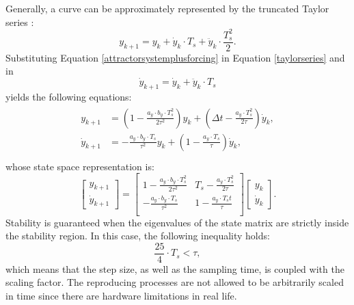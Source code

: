 Generally, a curve can be approximately represented by the truncated Taylor series \cite{gear1978stability}:
\begin{equation}
	\label{taylorseries}
	y_{k+1} = y_{k}+\dot{y}_{k}\cdot T_s + \ddot{y}_{k}\cdot\frac{T_{s}^2}{2}.
\end{equation}
Substituting Equation {\ref{attractorsystemplusforcing}} in Equation {\ref{taylorseries}} and in
\begin{equation}
	\dot{y}_{k+1}=\dot{y}_{k}+\ddot{y}_{k}\cdot T_s
\end{equation}
yields the following equations:
\begin{align}
	\begin{split}
		y_{k+1} &= \left(1-\frac{a_y\cdot b_y\cdot T_{s}^2}{2\tau^2}\right)y_{k}+\left(\Delta t -\frac{a_y\cdot T_{s}^2}{2\tau}\right)\dot{y}_{k},\\
		\dot{y}_{k+1} &= -\frac{a_y\cdot b_y\cdot T_{s}}{\tau^2}y_{k} + \left(1-\frac{a_y\cdot T_{s}}{\tau}\right)\dot{y}_{k} ,\\
	\end{split}
\end{align}
whose state space representation is:
\begin{equation}
	\begin{bmatrix}
	y_{k+1}\\\dot{y}_{k+1}
	\end{bmatrix}=\begin{bmatrix}
	1-\frac{a_y\cdot b_y\cdot T_{s}^2}{2\tau^2}&T_{s} -\frac{a_y\cdot T_{s}^2}{2\tau}\\- \frac{a_y\cdot b_y\cdot T_{s}}{\tau^2}&1-\frac{a_y\cdot T_{s} t}{\tau}\\
	\end{bmatrix}\begin{bmatrix}
	y_{k}\\\dot{y}_{k}
	\end{bmatrix}.
\end{equation}
Stability is guaranteed when the eigenvalues of the state matrix are strictly inside the stability region. In this case, the following inequality holds:
\begin{equation}
\label{timescalingbound1}
	\frac{25}{4}\cdot T_{s} < \tau,
\end{equation}
which means that the step size, as well as the sampling time, is coupled with the scaling factor. The reproducing processes are not allowed to be arbitrarily scaled in time since there are hardware limitations in real life.
